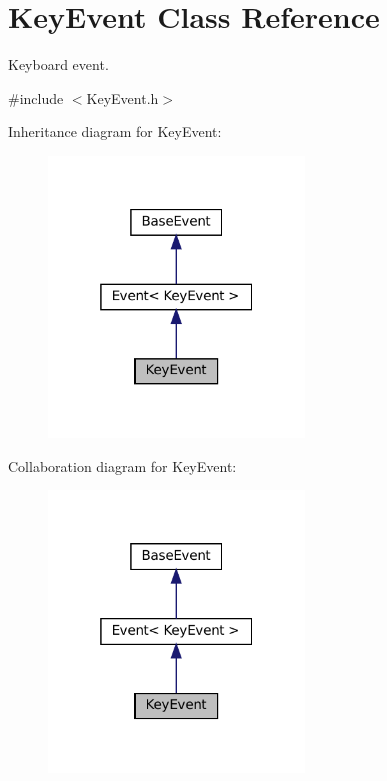 \hypertarget{classKeyEvent}{}\section{Key\+Event Class Reference}
\label{classKeyEvent}


Keyboard event.  




{\ttfamily \#include $<$Key\+Event.\+h$>$}



Inheritance diagram for Key\+Event\+:
\nopagebreak
\begin{figure}[H]
\begin{center}
\leavevmode
\includegraphics[width=193pt]{classKeyEvent__inherit__graph}
\end{center}
\end{figure}


Collaboration diagram for Key\+Event\+:
\nopagebreak
\begin{figure}[H]
\begin{center}
\leavevmode
\includegraphics[width=193pt]{classKeyEvent__coll__graph}
\end{center}
\end{figure}
